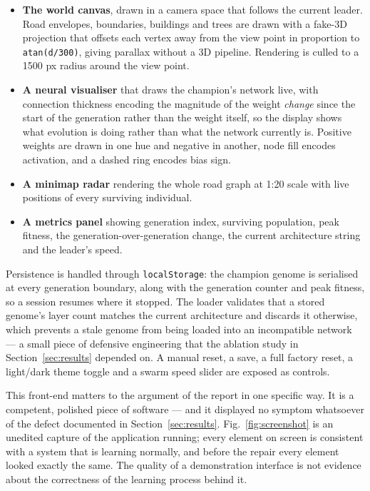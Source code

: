 \documentclass[conference]{IEEEtran}
\begin{document}
\begin{itemize}
\item \textbf{The world canvas}, drawn in a camera space that follows the current leader. Road envelopes, boundaries, buildings and trees are drawn with a fake-3D projection that offsets each vertex away from the view point in proportion to \texttt{atan(d/300)}, giving parallax without a 3D pipeline. Rendering is culled to a 1500 px radius around the view point.
\item \textbf{A neural visualiser} that draws the champion's network live, with connection thickness encoding the magnitude of the weight \emph{change} since the start of the generation rather than the weight itself, so the display shows what evolution is doing rather than what the network currently is. Positive weights are drawn in one hue and negative in another, node fill encodes activation, and a dashed ring encodes bias sign.
\item \textbf{A minimap radar} rendering the whole road graph at 1:20 scale with live positions of every surviving individual.
\item \textbf{A metrics panel} showing generation index, surviving population, peak fitness, the generation-over-generation change, the current architecture string and the leader's speed.
\end{itemize}

Persistence is handled through \texttt{localStorage}: the champion genome is serialised at every generation boundary, along with the generation counter and peak fitness, so a session resumes where it stopped. The loader validates that a stored genome's layer count matches the current architecture and discards it otherwise, which prevents a stale genome from being loaded into an incompatible network — a small piece of defensive engineering that the ablation study in Section~\ref{sec:results} depended on. A manual reset, a save, a full factory reset, a light/dark theme toggle and a swarm speed slider are exposed as controls.

This front-end matters to the argument of the report in one specific way. It is a competent, polished piece of software — and it displayed no symptom whatsoever of the defect documented in Section~\ref{sec:results}. Fig.~\ref{fig:screenshot} is an unedited capture of the application running; every element on screen is consistent with a system that is learning normally, and before the repair every element looked exactly the same. The quality of a demonstration interface is not evidence about the correctness of the learning process behind it.
\end{document}
